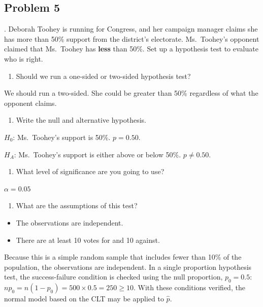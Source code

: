 \documentclass[
]{book}
\providecommand{\tightlist}{%
  \setlength{\itemsep}{0pt}\setlength{\parskip}{0pt}}
\begin{document}
\hypertarget{problem-5-7}{%
\subsection{Problem 5}\label{problem-5-7}}

. Deborah Toohey is running for Congress, and her campaign manager claims she has more than 50\% support from the district's electorate. Ms.~Toohey's opponent claimed that Ms.~Toohey has \textbf{less} than 50\%. Set up a hypothesis test to evaluate who is right.

\begin{enumerate}
\def\labelenumi{\alph{enumi}.}
\tightlist
\item
  Should we run a one-sided or two-sided hypothesis test?
\end{enumerate}

We should run a two-sided. She could be greater than 50\% regardless of what the opponent claims.

\begin{enumerate}
\def\labelenumi{\alph{enumi}.}
\setcounter{enumi}{1}
\tightlist
\item
  Write the null and alternative hypothesis.
\end{enumerate}

\(H_0\): Ms.~Toohey's support is 50\%. \(p = 0.50\).

\(H_A\): Ms.~Toohey's support is either above or below 50\%. \(p \neq 0.50\).

\begin{enumerate}
\def\labelenumi{\alph{enumi}.}
\setcounter{enumi}{2}
\tightlist
\item
  What level of significance are you going to use?
\end{enumerate}

\(\alpha = 0.05\)

\begin{enumerate}
\def\labelenumi{\alph{enumi}.}
\setcounter{enumi}{3}
\tightlist
\item
  What are the assumptions of this test?
\end{enumerate}

\begin{itemize}
\item
  The observations are independent.
\item
  There are at least 10 votes for and 10 against.
\end{itemize}

Because this is a simple random sample that includes fewer than 10\% of the population, the observations are independent. In a single proportion hypothesis test, the success-failure condition is checked using the null proportion, \(p_0=0.5\): \(np_0 = n(1-p_0) = 500\times 0.5 = 250 \geq 10\). With these conditions verified, the normal model based on the CLT may be applied to \(\hat{p}\).
\end{document}

